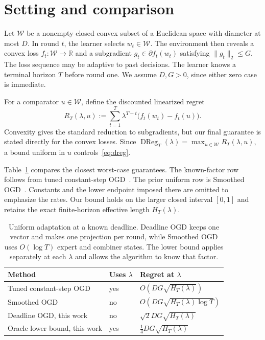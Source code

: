 \documentclass{article}
\newcommand{\W}{\mathcal W}
\newcommand{\DReg}{\operatorname{DReg}}
\begin{document}
\section{Setting and comparison}
\label{sec:setting}

Let $\W$ be a nonempty closed convex subset of a Euclidean space with diameter at most $D$. In round $t$, the learner selects $w_t\in\W$. The environment then reveals a convex loss $f_t:\W\to\mathbb R$ and a subgradient $g_t\in\partial f_t(w_t)$ satisfying $\|g_t\|_2\le G$. The loss sequence may be adaptive to past decisions. The learner knows a terminal horizon $T$ before round one. We assume $D,G>0$, since either zero case is immediate.

For a comparator $u\in\W$, define the discounted linearized regret \[ R_T(\lambda,u):=\sum_{t=1}^T\lambda^{T-t}\bigl(f_t(w_t)-f_t(u)\bigr). \] Convexity gives the standard reduction to subgradients, but our final guarantee is stated directly for the convex losses. Since $\DReg_T(\lambda)=\max_{u\in\W}R_T(\lambda,u)$, a bound uniform in $u$ controls~\eqref{eq:dreg}.

Table~\ref{tab:comparison} compares the closest worst-case guarantees. The known-factor row follows from tuned constant-step OGD~\citep{zhang2024discounted,yang2026uniform}. The prior uniform row is Smoothed OGD~\citep{yang2026uniform}. Constants and the lower endpoint imposed there are omitted to emphasize the rates. Our bound holds on the larger closed interval $[0,1]$ and retains the exact finite-horizon effective length $H_T(\lambda)$.

\begin{table}[t]
\centering
\small
\begin{tabular}{@{}lll@{}}
\toprule
Method & Uses $\lambda$ & Regret at $\lambda$ \\
\midrule
Tuned constant-step OGD & yes & $O(DG\sqrt{H_T(\lambda)})$ \\
Smoothed OGD~\citep{yang2026uniform} & no & $O(DG\sqrt{H_T(\lambda)\log T})$ \\
Deadline OGD, this work & no & $\sqrt2DG\sqrt{H_T(\lambda)}$ \\
Oracle lower bound, this work & yes & $\frac14DG\sqrt{H_T(\lambda)}$ \\
\bottomrule
\end{tabular}
\caption{Uniform adaptation at a known deadline. Deadline OGD keeps one vector and makes one projection per round, while Smoothed OGD uses $O(\!\log T)$ expert and combiner states. The lower bound applies separately at each $\lambda$ and allows the algorithm to know that factor.}
\label{tab:comparison}
\end{table}
\end{document}
